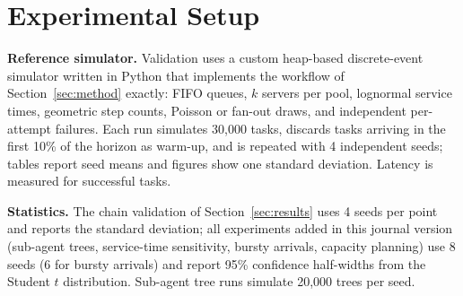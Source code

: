 \documentclass[journal]{IEEEtran}
\begin{document}
\section{Experimental Setup}\label{sec:setup}
\textbf{Reference simulator.} Validation uses a custom heap-based discrete-event simulator written in Python that implements the workflow of Section~\ref{sec:method} exactly: FIFO queues, $k$ servers per pool, lognormal service times, geometric step counts, Poisson or fan-out draws, and independent per-attempt failures. Each run simulates 30{,}000 tasks, discards tasks arriving in the first 10\% of the horizon as warm-up, and is repeated with 4 independent seeds; tables report seed means and figures show one standard deviation. Latency is measured for successful tasks.

\textbf{Statistics.} The chain validation of Section~\ref{sec:results} uses 4 seeds per point and reports the standard deviation; all experiments added in this journal version (sub-agent trees, service-time sensitivity, bursty arrivals, capacity planning) use 8 seeds (6 for bursty arrivals) and report 95\% confidence half-widths from the Student $t$ distribution. Sub-agent tree runs simulate 20{,}000 trees per seed.
\end{document}
